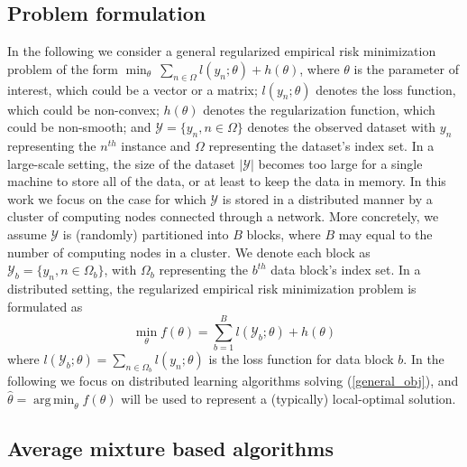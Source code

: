\documentclass{article}
\DeclareMathOperator*{\argmin}{arg\,min}
\newcommand{\1}[0]{\ensuremath{\boldsymbol{1}}\xspace}
\begin{document}
\subsection{Problem formulation}\label{problem_formulation}

In the following we consider a general regularized empirical risk minimization problem of the form $\min_\theta ~ \sum_{n\in\Omega}l(y_n; \theta)+ h(\theta)$, where $\theta$ is the parameter of interest, which could be a vector or a matrix; $l(y_n; \theta)$ denotes the loss function, which could be non-convex; $h(\theta)$ denotes the regularization function, which could be non-smooth; and $\mathcal{Y} = \{y_n, n\in\Omega\}$ denotes the observed dataset with $y_n$ representing the $n^{th}$ instance and $\Omega$ representing the dataset's index set. In a large-scale setting, the size of the dataset $|\mathcal{Y}|$ becomes too large for a single machine to store all of the data, or at least to keep the data in memory. In this work we focus on the case for which $\mathcal{Y}$ is stored in a distributed manner by a cluster of computing nodes connected through a network. More concretely, we assume $\mathcal{Y}$ is (randomly) partitioned into $B$ blocks, where $B$ may equal to the number of computing nodes in a cluster. We denote each block as $\mathcal{Y}_b = \{y_n, n \in \Omega_b\}$, with $\Omega_b$ representing the $b^{th}$ data block's index set. In a distributed setting, the regularized empirical risk minimization problem is formulated as
\begin{equation}\label{general_obj}
\textstyle\min_{\theta} f(\theta) = \sum_{b=1}^Bl(\mathcal{Y}_b; \theta)+h(\theta)
\end{equation}
where $l(\mathcal{Y}_b; \theta) = \sum_{n\in\Omega_b}l(y_n; \theta)$ is the loss function for data block $b$. In the following we focus on distributed learning algorithms solving (\ref{general_obj}), and $\hat\theta = \argmin_\theta f(\theta)$ will be used to represent a (typically) local-optimal solution.

\subsection{Average mixture based algorithms}\label{AVGM}
\end{document}
